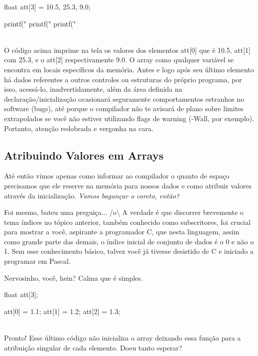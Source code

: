 \begin{ccode}
  float att[3] = {10.5, 25.3, 9.0};

  printf("%
  printf("%
  printf("%
\end{ccode}
\\

O código acima imprime na tela os valores dos elementos att[0] que é 10.5, att[1] com 25.3, e o att[2] respectivamente 9.0. O array como qualquer variável se encontra em locais específicos da memória. Antes e logo após seu último elemento há dados referentes a outros controles ou estruturas do próprio programa, por isso, acessá-lo, inadvertidamente, além da área definida na declaração/inicialização ocasionará seguramente comportamentos estranhos no software (bugs), até porque o compilador não te avisará de plano sobre limites extrapolados se você não estiver utilizando flags de warning (-Wall, por exemplo). Portanto, atenção redobrada e vergonha na cara.

\subsection{Atribuindo Valores em Arrays}
Até então vimos apenas como informar ao compilador o quanto de espaço precisamos que ele reserve na memória para nossos dados e como atribuir valores através da inicialização. \textit{Vamos bagunçar o coreto, então?}


Foi mesmo, bateu uma preguiça... /o{\textbackslash} A verdade é que discorrer brevemente o tema índices no tópico anterior, também conhecido como subscritores, foi crucial para mostrar a você, aspirante a programador C, que nesta linguagem, assim como grande parte das demais, o índice inicial de conjunto de dados é o 0 e não o 1. Sem esse conhecimento básico, talvez você já tivesse desistido de C e iniciado a programar em Pascal.


Nervosinho, você, hein? Calma que é simples.

\begin{ccode}
  float att[3];

  att[0] = 1.1;
  att[1] = 1.2;
  att[2] = 1.3;
\end{ccode}
\\

Pronto! Esse último código não inicializa o array deixando essa função para a atribuição singular de cada elemento. Doeu tanto esperar?

